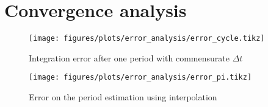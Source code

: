 
\section{Convergence analysis}%
\label{sec:convergence}

\begin{figure}[H]
    \centering
    \texttt{[image: figures/plots/error\_analysis/error\_cycle.tikz]}
    \caption{Integration error after one period with commensurate $\Delta t$}%
    \label{fig:error_cycle}
\end{figure}

\begin{figure}[H]
    \centering
    \texttt{[image: figures/plots/error\_analysis/error\_pi.tikz]}
    \caption{Error on the period estimation using interpolation}%
    \label{fig:error_pi}
\end{figure}
